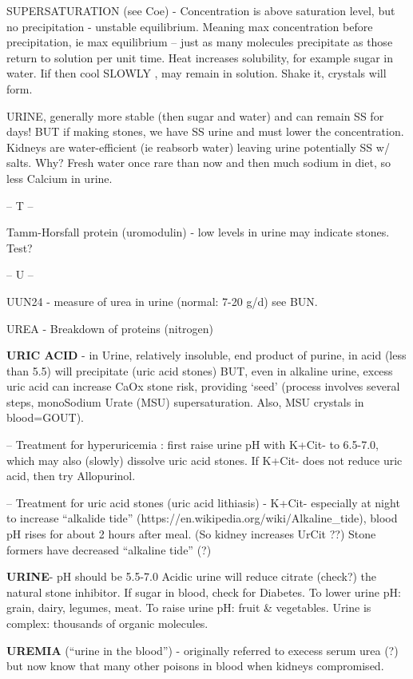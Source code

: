 SUPERSATURATION (see Coe) - Concentration is above saturation level, but
no precipitation - unstable equilibrium. Meaning max concentration
before precipitation, ie max equilibrium -- just as many molecules
precipitate as those return to solution per unit time. Heat increases
solubility, for example sugar in water. Iif then cool SLOWLY , may
remain in solution. Shake it, crystals will form.

URINE, generally more stable (then sugar and water) and can remain SS
for days! BUT if making stones, we have SS urine and must lower the
concentration. Kidneys are water-efficient (ie reabsorb water) leaving
urine potentially SS w/ salts. Why? Fresh water once rare than now and
then much sodium in diet, so less Calcium in urine.

-- T --

Tamm-Horsfall protein (uromodulin) - low levels in urine may indicate
stones. Test?

-- U --

UUN24 - measure of urea in urine (normal: 7-20 g/d) see BUN.

UREA - Breakdown of proteins (nitrogen)

\textbf{URIC ACID} - in Urine, relatively insoluble, end product of
purine, in acid (less than 5.5) will precipitate (uric acid stones) BUT,
even in alkaline urine, excess uric acid can increase CaOx stone risk,
providing `seed' (process involves several steps, monoSodium Urate (MSU)
supersaturation. Also, MSU crystals in blood=GOUT).

-- Treatment for hyperuricemia : first raise urine pH with K+Cit- to
6.5-7.0, which may also (slowly) dissolve uric acid stones. If K+Cit-
does not reduce uric acid, then try Allopurinol.

-- Treatment for uric acid stones (uric acid lithiasis) - K+Cit-
especially at night to increase ``alkalide tide''
(https://en.wikipedia.org/wiki/Alkaline\_tide), blood pH rises for about
2 hours after meal. (So kidney increases UrCit ??) Stone formers have
decreased ``alkaline tide'' (?)

\textbf{URINE}- pH should be 5.5-7.0 Acidic urine will reduce citrate
(check?) the natural stone inhibitor. If sugar in blood, check for
Diabetes. To lower urine pH: grain, dairy, legumes, meat. To raise urine
pH: fruit \& vegetables. Urine is complex: thousands of organic
molecules.

\textbf{UREMIA} (``urine in the blood'') - originally referred to
execess serum urea (?) but now know that many other poisons in blood
when kidneys compromised.

